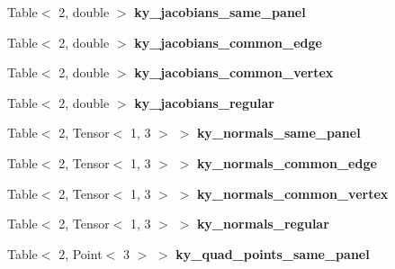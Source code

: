 \begin{DoxyCompactItemize}
Table$<$ 2, double $>$ {\bfseries ky\+\_\+jacobians\+\_\+same\+\_\+panel}
\item 
\mbox{\label{structLaplaceBEM_1_1PairCellWiseScratchData_aeac246863ee663cd5b977cbb51809542}} 
Table$<$ 2, double $>$ {\bfseries ky\+\_\+jacobians\+\_\+common\+\_\+edge}
\item 
\mbox{\label{structLaplaceBEM_1_1PairCellWiseScratchData_a0a5c02d73cbf27f1c1b8bf4347bc6149}} 
Table$<$ 2, double $>$ {\bfseries ky\+\_\+jacobians\+\_\+common\+\_\+vertex}
\item 
\mbox{\label{structLaplaceBEM_1_1PairCellWiseScratchData_a712bbca9fc35f6953a235cc0950c35d7}} 
Table$<$ 2, double $>$ {\bfseries ky\+\_\+jacobians\+\_\+regular}
\item 
\mbox{\label{structLaplaceBEM_1_1PairCellWiseScratchData_ab2ff0498846ca2cb6683f3f16b52b1ed}} 
Table$<$ 2, Tensor$<$ 1, 3 $>$ $>$ {\bfseries ky\+\_\+normals\+\_\+same\+\_\+panel}
\item 
\mbox{\label{structLaplaceBEM_1_1PairCellWiseScratchData_a428bf1cd494daa754755bf8905742fbc}} 
Table$<$ 2, Tensor$<$ 1, 3 $>$ $>$ {\bfseries ky\+\_\+normals\+\_\+common\+\_\+edge}
\item 
\mbox{\label{structLaplaceBEM_1_1PairCellWiseScratchData_aa0c83da483b1ec968e1c9b836d5c684a}} 
Table$<$ 2, Tensor$<$ 1, 3 $>$ $>$ {\bfseries ky\+\_\+normals\+\_\+common\+\_\+vertex}
\item 
\mbox{\label{structLaplaceBEM_1_1PairCellWiseScratchData_ab00760b52f17c91294da7651c21937ee}} 
Table$<$ 2, Tensor$<$ 1, 3 $>$ $>$ {\bfseries ky\+\_\+normals\+\_\+regular}
\item 
\mbox{\label{structLaplaceBEM_1_1PairCellWiseScratchData_a78dd048ae70be7b101eb670a6c89e75d}} 
Table$<$ 2, Point$<$ 3 $>$ $>$ {\bfseries ky\+\_\+quad\+\_\+points\+\_\+same\+\_\+panel}
\item 

\end{DoxyCompactItemize}
